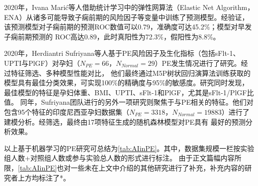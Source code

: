 2020年，Ivana Mari{\'{c}}\cite{Maric2020}等人借助统计学习中的弹性网算法（Elastic Net Algorithm，ENA）从诸多可能导致子痫前期的风险因子等变量中训练了预测模型。经验证，该预测模型对子痫前期的预测ROC数值可以0.79，准确度可达45.2\%；模型对早发子痫前期预测的
ROC高达0.89，此时真阳性为72.3\%，假阳性为8.8\%。

2020年，Herdiantri Sufriyana等人\cite{Sufriyana2020-1}基于PE风险因子及生化指标（包括sFlt-1、UPTI与PlGF）对孕妇（$N_{PE}=66$，$N_{Normal}=29$）PE发生情况进行了研究。经过特征筛选、多种模型性能对比，
他们最终通过M5P树状回归演算法训练获取的模型具有最佳分类效果，可实现100\%的精确度与95\%的敏感度。研究同时发现，最佳模型的特征是孕妇体重、BMI、UPTI、sFlt-1和PlGF，尤其是sFlt-1/PlGF比值。
同年，Sufriyana团队进行的另外一项研究\cite{Sufriyana2020}则聚焦于与PE相关的特征。他们对包含95个特征的印度尼西亚孕妇数据集（$N_{PE}=3318$，$N_{Normal}=19883$）进行了建模分析。经筛选，最终由17项特征生成的随机森林模型对PE具有
最好的预测分析效果。

以上基于机器学习的PE研究可总结为\autoref{tab:AIinPE}。其中，数据集规模一栏按实验组人数+对照组人数或参与实验总人数的形式进行标注。
由于正文篇幅内容所限，\autoref{tab:AIinPE}也对一些未在上文中介绍的其他研究进行了补充，补充内容的研究者上方均标注了*。

